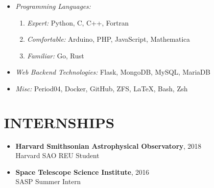 \documentclass[margin, 10pt]{res} %
\begin{document}
\begin{resume}
\begin{itemize}
\item {\sl Programming Languages:} 
    \begin{enumerate}
        \item{\sl Expert: } Python, C, C++, Fortran
        \item{\sl Comfortable: } Arduino, PHP, JavaScript, Mathematica
        \item{\sl Familiar: } Go, Rust 
    \end{enumerate}
\item {\sl Web Backend Technologies:} Flask, MongoDB, MySQL, MariaDB
\item {\sl Misc:} Period04, Docker, GitHub, ZFS, LaTeX, Bash, Zsh
\end{itemize}
 
\section{INTERNSHIPS}
\begin{itemize}
  \item \textbf{{\scriptsize Harvard Smithsonian Astrophysical Observatory}}, {\small 2018} \\Harvard SAO REU Student
  \item \textbf{{\scriptsize Space Telescope Science Institute}}, {\small 2016} \\SASP Summer Intern
\end{itemize}
 



\end{resume}
\end{document}

